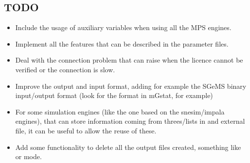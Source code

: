 \documentclass[letterpaper,10pt,english]{sphinxmanual}
\begin{document}
\subsection{TODO}
\label{\detokenize{appendices:todo}}\begin{itemize}
\item {} 
Include the usage of auxiliary variables when using all the MPS
engines.

\item {} 
Implement all the features that can be described in the parameter
files.

\item {} 
Deal with the connection problem that can raise when the licence
cannot be verified or the connection is slow.

\item {} 
Improve the output and input format, adding for example the SGeMS
binary input/output format (look for the format in mGstat, for
example)

\item {} 
For some simulation engines (like the one based on the snesim/impala engines), 
that can store information coming from threes/lists in and external file, it can be 
useful to allow the re\sphinxhyphen{}use of these.

\item {} 
Add some functionality to delete all the output files created,
something like  or  mode.

\end{itemize}
\end{document}

